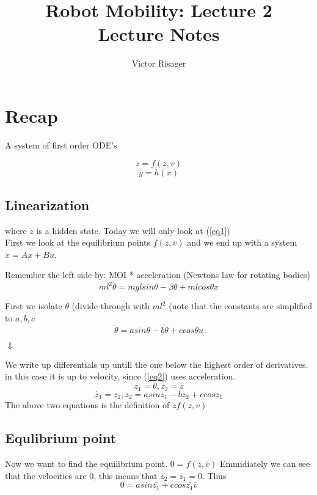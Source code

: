 \documentclass[a4paper]{article}
\title{Robot Mobility: Lecture 2 \\
	\large Lecture Notes}
\author{Victor Risager}
\begin{document}
\maketitle

\section{Recap}

A system of first order ODE's

\begin{equation}\label{eq1}
\dot{z} = f(z,v)
\end{equation}
\[
\overline{y} = h(x)
\]

\subsection{Linearization}

where $ \dot{z} $ is a hidden state. Today we will only look at (\ref{eq1})\\
First we look at the equilibrium points $ f(\overline{z}, \overline{v}) $ and we end up with a system $ \dot{x} = Ax + Bu $. 

\hfill {}


\hfill {} 


Remember the left side by: MOI * acceleration (Newtons law for rotating bodies)
\begin{equation}
ml^{2} \ddot{\theta} =  mgl sin \theta - \beta \dot{\theta} + m l cos \theta \ddot{x} 
\end{equation}


First we isolate $ \ddot{\theta}  $ (divide through with $ ml^{2}  $ (note that the constants are simplified to $ a,b,c $
\begin{equation} \label{eq2}
\ddot{\theta} =  a sin \theta - b \dot{\theta} + c cos \theta u
\end{equation}


$ \Downarrow $

We write up differentials up untill the one below the highest order of derivatives. in this case it is up to velocity, since (\ref{eq2}) uses acceleration.
\[
z_1 = \theta, z_2 = \dot{z}
\] 
\[
	\dot{z_1} = z_2, z_2 = a sin z_1 - b z_2 + c cos z_1 
\] 
The above two equations is the definition of $ \dot{z} f(z,v) $

\subsection{Equlibrium point}
Now we want to find the equilibrium point. $ 0 = f(\overline{z}, \overline{v}) $
Emmidiately we can see that the velocities are 0, this means that $ z_2 = \dot{z_1} = 0 $.  Thus 
 \[
0 = a sin \overline{z_1} + c cos \overline{z_1} \overline{v}
\] 
\end{document}
